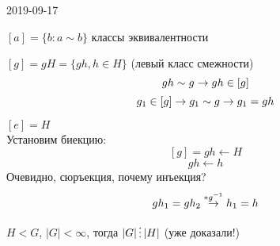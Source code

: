 \documentclass[main]{subfiles}
\begin{document}
\begin{lect}{2019-09-17}
    \begin{definition}
        $[a] = \{b:a  \sim b\}$ классы эквивалентности
    \end{definition}

    \begin{definition}
        $[g] = g H = \{g h, h \in H \}$ (левый класс смежности)
        \[g h \sim g \rightarrow g h \in [g]\]
        \[g_1 \in [g] \rightarrow g_1 \sim g \rightarrow g_1 = g h\]
    \end{definition}

    \begin{utv}
        $[e]=H$\\
        Установим биекцию:
        \[[g]=gh \leftarrow H\]
        \[gh \leftarrow h\]
        Очевидно, сюръекция, почему инъекция?
        \[g h_1 = g h_2 \overset{*g^{-1}}{\rightarrow} h_1 = h\]
    \end{utv}

    \begin{theorem}[Лагранжа]
        $H < G$, $|G| < \infty$, тогда $|G| \devides |H|$ (уже доказали!)
    \end{theorem}
\end{lect}
\end{document}
